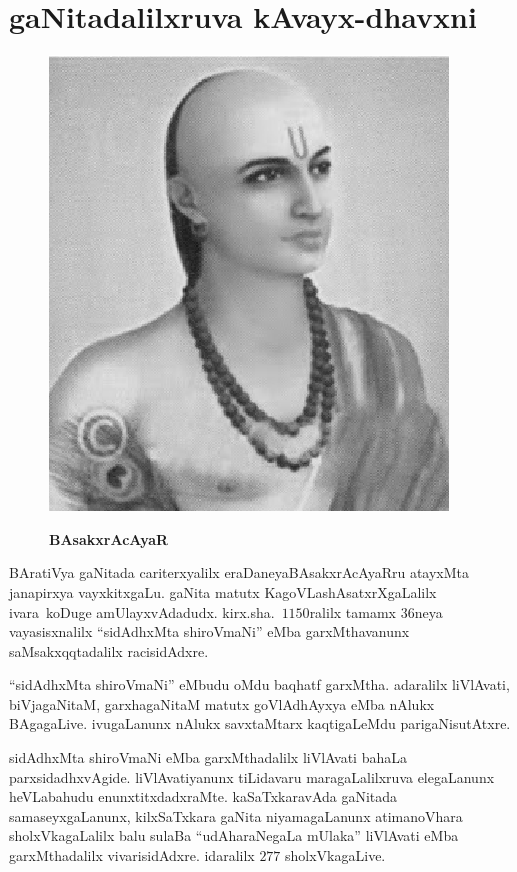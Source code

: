 \chapter{gaNitadalilxruva kAvayx-dhavxni}\label{chap13}

\begin{figure}
  \centering\includegraphics[scale=0.8]{src/figures/bhaskaracharya-II.eps}
  
  {\bf BAsakxrAcAyaR}
    \end{figure}
    
BAratiVya gaNitada cariterxyalilx eraDaneya\break BAsakxrAcAyaRru atayxMta janapirxya vayxkitxgaLu.\- gaNita matutx KagoVLashAsatxrXgaLalilx \hbox{ivara koDuge} amUlayxvAdadudx. kirx.sha.\ $1150$ralilx tamamx $36$neya vayasisxnalilx ``sidAdhxMta shiroV\-maNi'' eMba garxMthavanunx saMsakxqqtadalilx racisidAdxre.

``sidAdhxMta shiroVmaNi'' eMbudu oMdu baqhatf garxMtha. adaralilx liVlAvati, biVjagaNitaM,\- garxhagaNitaM matutx goVlAdhAyxya eMba nAlukx BAgagaLive. ivugaLanunx nAlukx savxtaMtarx kaqti\-gaLeMdu parigaNisutAtxre.

sidAdhxMta shiroVmaNi eMba garxMthadalilx liVlAvati bahaLa parxsidadhxvAgide. liVlAvatiyanunx tiLidavaru maragaLalilxruva elegaLanunx heVLabahudu enunxtitxdadxraMte. kaSaTxkaravAda gaNitada samaseyxgaLanunx, kilxSaTxkara gaNita niyamagaLanunx atimanoVhara sholxVkagaLalilx balu sulaBa ``udAharaNegaLa mUlaka'' liVlAvati eMba garxMthadalilx vivarisidAdxre. idaralilx $277$ sholxVkagaLive.

